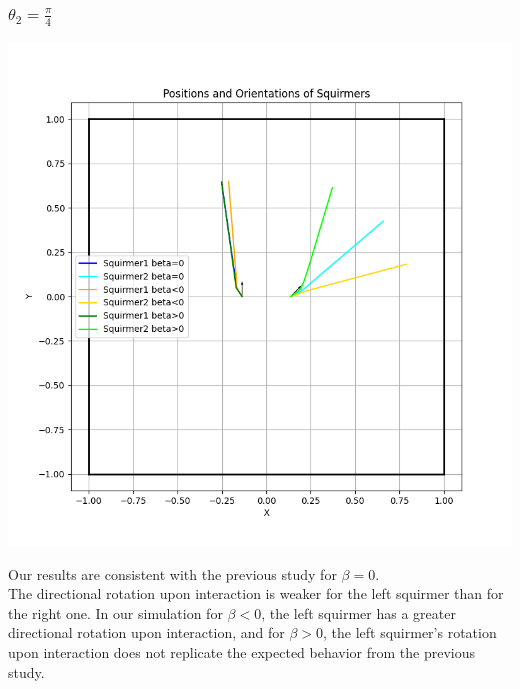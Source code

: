 \documentclass{article}
\begin{document}
\subsubsection{$\theta_2 = \frac{\pi}{4}$}
\begin{center}
   \includegraphics[width=1\textwidth]{graphs/simulations/twosquirmerinter/sq2.pi.4.png}
\end{center}
Our results are consistent with the previous study for $\beta = 0$.\\
The directional rotation upon interaction is weaker for the left squirmer than for the right one.
 In our simulation for $\beta < 0$, the left squirmer has a greater directional rotation upon interaction,
 and for $\beta > 0$, the left squirmer's rotation upon interaction does not replicate the expected behavior from the previous study.\\
\end{document}
